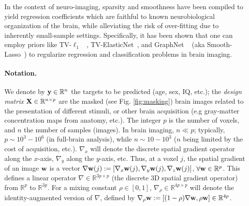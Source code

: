 In the context of neuro-imaging, sparsity and smoothness have been compiled to yield
regression coefficients which are faithful to known neurobiological organization of the brain,
while alleviating the risk of over-fitting due to inherently small-sample settings.
Specifically, it has been shown that one can employ priors like TV-$\ell_1$
~\citep{baldassarre2012,gramfort2013}, TV-ElasticNet~\citep{dubois2014predictive},
and GraphNet ~\citep{grosenick2013}
(aka Smooth-Lasso~\citep{hebiri2011})
to regularize regression and classification
problems in brain imaging.

\paragraph{Notation.} We denote by ${\mathbf{y}} \in \mathbb{R}^{n}$ the targets to
be predicted (age, sex, IQ, etc.); the \textit{design matrix}
${\mathbf{X}}\in\mathbb{R}^{n \times p}$ are the masked (see Fig. \ref{fig:masking})
brain images related to the presentation of different
stimuli, or other brain acquisition (e.g gray-matter concentration
maps from anatomy, etc.). The integer $p$ is the number of voxels,
and $n$ the number of samples (images). In brain imaging, $n \ll p$;
typically, $p \sim 10^3-10^6$ (in full-brain analysis),
while $n \sim 10-10^3$ ($n$ being limited by the cost of acquisition,
etc.). $\nabla_x$ will denote the discrete spatial gradient operator
along the $x$-axis, $\nabla_y$ along the $y$-axis, etc.
Thus, at a voxel $j$, the spatial gradient of an image $\mathbf{w}$ is a vector ${\nabla} {\mathbf{w}}(j) := [\nabla_{x} {\mathbf{w}}(j), \nabla_{y} {\mathbf{w}}(j), \nabla_{z} {\mathbf{w}}(j)]$, $\forall \mathbf{w} \in \mathbb R^p$.
This defines a linear operator $\nabla \in \mathbb R^{3p \times p}$ (the discrete 3D spatial gradient operator) from $\mathbb R^p$ to $\mathbb R^{3p}$. For a mixing constant $\rho \in [0, 1]$, $\nabla_\rho \in \mathbb R^{4p \times p}$ will denote the identity-augmented version of $\nabla$, defined by ${\nabla_\rho} {\mathbf{w}} := [(1-\rho)\nabla \mathbf{w}, \rho \mathbf{w}] \in \mathbb R^{4p}$.


